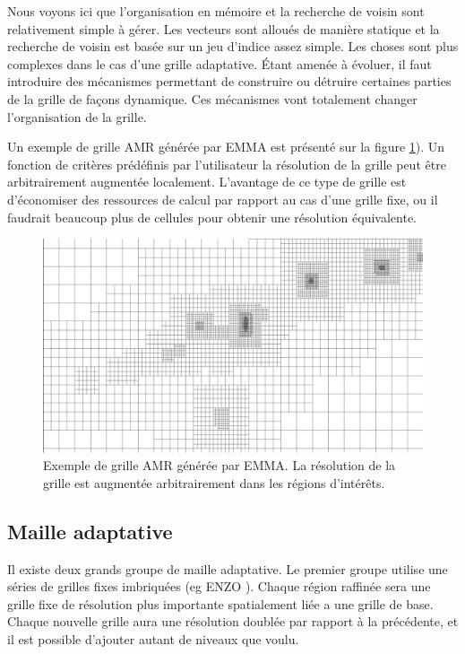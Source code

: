 Nous voyons ici que l'organisation en mémoire et la recherche de voisin sont relativement simple à gérer.
Les vecteurs sont alloués de manière statique et la recherche de voisin est basée sur un jeu d'indice assez simple.
Les choses sont plus complexes dans le cas d'une grille adaptative.
Étant amenée à évoluer, il faut introduire des mécanismes permettant de construire ou détruire certaines parties de la grille de façons dynamique.
Ces mécanismes vont totalement changer l'organisation de la grille.

Un exemple de grille \ac{AMR} générée par EMMA est présenté sur la figure \ref{fig:AMR}).
Un fonction de critères prédéfinis par l'utilisateur la résolution de la grille peut être arbitrairement augmentée localement.
L'avantage de ce type de grille est d'économiser des ressources de calcul par rapport au cas d'une grille fixe, ou il faudrait beaucoup plus de cellules pour obtenir une résolution équivalente.

\begin{figure}
        \includegraphics[width=.95\linewidth]{img/02/AMR.pdf} 
        \caption[Grille générée par EMMA]{Exemple de grille \ac{AMR} générée par EMMA. 
        La  résolution de la grille est augmentée arbitrairement dans les régions d'intérêts.
 		\label{fig:AMR}}
\end{figure}

\subsection{Maille adaptative}

Il existe deux grands groupe de maille adaptative.
Le premier groupe utilise une séries de grilles fixes imbriquées (eg ENZO \cite{bryan_enzo:_2014}).
Chaque région raffinée sera une grille fixe de résolution plus importante spatialement liée a une grille de base.
Chaque nouvelle grille aura une résolution doublée par rapport à la précédente, et il est possible d'ajouter autant de niveaux que voulu.

